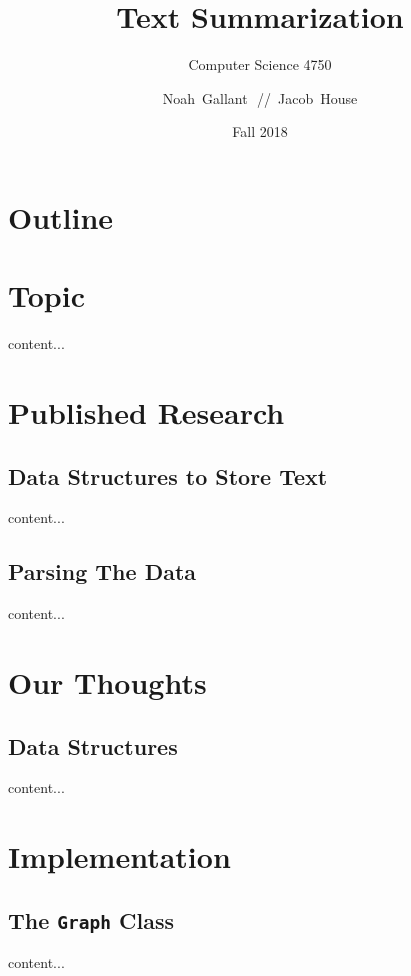 \documentclass[xcolor={usenames,dvipsnames,svgnames}]{beamer}
\title{Text Summarization}
\subtitle{Computer Science 4750}
\author{Noah~Gallant\,~//~Jacob~House}
\date{Fall 2018}
\begin{document}
\begin{frame}[plain]
\titlepage
\end{frame}

\startheads

\section*{Outline}
\begin{frame}
	\tableofcontents
\end{frame}

\section{Topic}
\begin{frame}
content...
\end{frame}

\section{Published Research}
\subsection{Data Structures to Store Text}
\begin{frame}
content...
\end{frame}

\subsection{Parsing The Data}
\begin{frame}
content...
\end{frame}

\section{Our Thoughts}
\subsection{Data Structures}
\begin{frame}
content...
\end{frame}

\section{Implementation}
\subsection{The {\tt Graph} Class}
\begin{frame}
content...
\end{frame}
\end{document}
